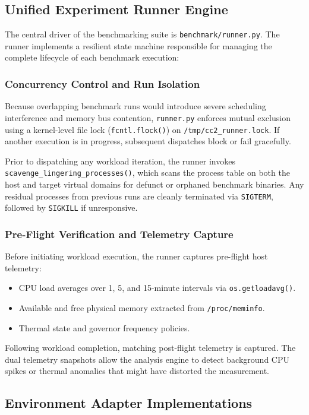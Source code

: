 \subsection{Unified Experiment Runner Engine}
\label{subsec:runner_engine}

The central driver of the benchmarking suite is \texttt{benchmark/runner.py}. The runner implements a resilient state machine responsible for managing the complete lifecycle of each benchmark execution:

\subsubsection{Concurrency Control and Run Isolation}
Because overlapping benchmark runs would introduce severe scheduling interference and memory bus contention, \texttt{runner.py} enforces mutual exclusion using a kernel-level file lock (\texttt{fcntl.flock()}) on \texttt{/tmp/cc2\_runner.lock}. If another execution is in progress, subsequent dispatches block or fail gracefully.

Prior to dispatching any workload iteration, the runner invokes \texttt{scavenge\_lingering\_processes()}, which scans the process table on both the host and target virtual domains for defunct or orphaned benchmark binaries. Any residual processes from previous runs are cleanly terminated via \texttt{SIGTERM}, followed by \texttt{SIGKILL} if unresponsive.

\subsubsection{Pre-Flight Verification and Telemetry Capture}
Before initiating workload execution, the runner captures pre-flight host telemetry:
\begin{itemize}
    \item CPU load averages over 1, 5, and 15-minute intervals via \texttt{os.getloadavg()}.
    \item Available and free physical memory extracted from \texttt{/proc/meminfo}.
    \item Thermal state and governor frequency policies.
\end{itemize}
Following workload completion, matching post-flight telemetry is captured. The dual telemetry snapshots allow the analysis engine to detect background CPU spikes or thermal anomalies that might have distorted the measurement.

\subsection{Environment Adapter Implementations}
\label{subsec:adapters}

